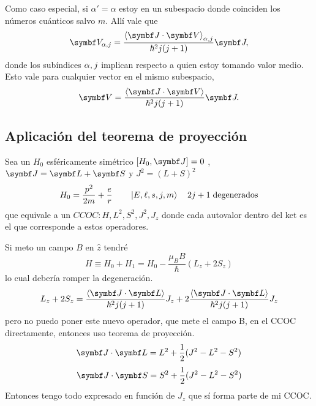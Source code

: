 \documentclass[10pt,oneside]{CBFT_book}
\begin{document}
Como caso especial, si $\alpha' =\alpha$ estoy en un subespacio donde coinciden los números cuánticos
salvo $m$. Allí vale que 
\[
	\vb{V}_{\a,j} = \frac{ \Braket{\vb{J}\cdot\vb{V}}_{\a,j} }{\hbar^2j(j+1)} \vb{J},
\]
donde los subíndices $\alpha,j$ implican respecto a quien estoy tomando valor medio. Esto vale para cualquier
vector en el mismo subespacio,
\[
	\vb{V} = \frac{\Braket{\vb{J}\cdot\vb{V}}}{\hbar^2j(j+1)} \vb{J}.
\]

\subsection{Aplicación del teorema de proyección}

Sea un $H_0$ esféricamente simétrico $[H_0,\vb{J}]=0$ , $\vb{J}=\vb{L}+\vb{S}$ y $J^2=(L+S)^2$
\[
	H_0 = \frac{p^2}{2m} + \frac{e}{r} \qquad \Ket{E,\ell,s,j,m} \quad 2j+1 \;\text{degenerados}
\]
que equivale a un $CCOC:H,L^2,S^2,J^2,J_z$ donde cada autovalor dentro del ket es el que corresponde a estos 
operadores.

Si meto un campo $B$ en $\hat{z}$ tendré 
\[
	H \equiv H_0 + H_1 = H_0 - \frac{\mu_B B}{\hbar}(L_z + 2S_z)
\]
lo cual debería romper la degeneración.
\[
	L_z + 2S_z = \frac{\Braket{\vb{J}\cdot\vb{L}}}{\hbar^2j(j+1)}J_z + 
		2\frac{\Braket{\vb{J}\cdot\vb{L}}}{\hbar^2j(j+1)}J_z
\]
pero no puedo poner este nuevo operador, que mete el campo B, en el CCOC directamente, entonces uso teorema 
de proyección.
\[
	\vb{J}\cdot\vb{L} = L^2 + \frac{1}{2}( J^2 - L^2 - S^2 )
\]
\[
	\vb{J}\cdot\vb{S} = S^2 + \frac{1}{2}( J^2 - L^2 - S^2 )
\]
Entonces tengo todo expresado en función de $J_z$ que sí forma parte de mi CCOC.



\end{document}
